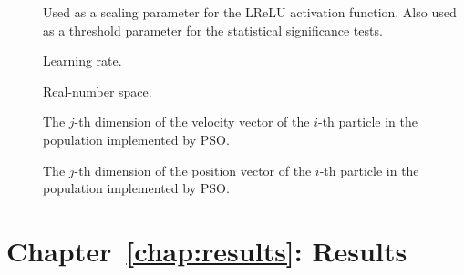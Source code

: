 \begin{description}
	\item [\parbox{2cm}{$\alpha$}] Used as a scaling parameter for the \acs{LReLU} activation function. Also used as a threshold parameter for the statistical significance tests.
	\item [\parbox{2cm}{$\eta$}] Learning rate.
	\item [\parbox{2cm}{$\mathbb{R}$}] Real-number space.
	\item [\parbox{2cm}{$v_{ij}$}] The $j$-th dimension of the velocity vector of the $i$-th particle in the population implemented by \acs{PSO}.
	\item [\parbox{2cm}{$x_{ij}$}] The $j$-th dimension of the position vector of the $i$-th particle in the population implemented by \acs{PSO}.
\end{description}

\section{Chapter~\ref{chap:results}: Results}
\label{sec:symbols:results}

